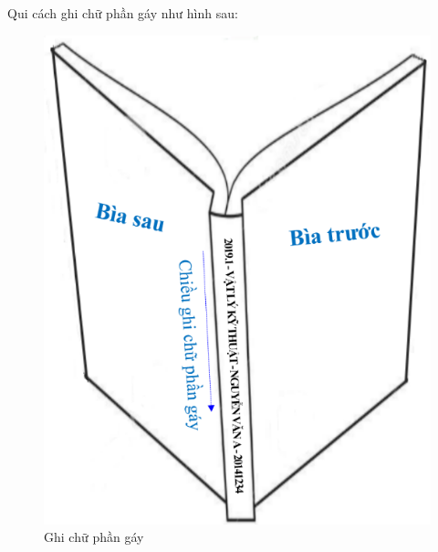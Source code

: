 Qui cách ghi chữ phần gáy như hình sau:

\begin{figure}
\centering
\includegraphics[scale=0.7]{figures/fig3}
\caption{Ghi chữ phần gáy}
\end{figure}


